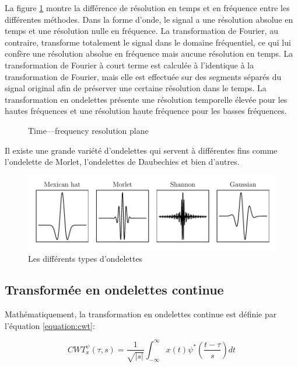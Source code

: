 La figure \ref{fig:time-frequency-plane} montre la différence de résolution en temps et en fréquence entre les différentes méthodes. Dans la forme d'onde, le signal a une résolution absolue en temps et une résolution nulle en fréquence. La transformation de Fourier, au contraire, transforme totalement le signal dans le domaine fréquentiel, ce qui lui confère une résolution absolue en fréquence mais aucune résolution en temps. La transformation de Fourier à court terme est calculée à l'identique à la transformation de Fourier, mais elle est effectuée sur des segments séparés du signal original afin de préserver une certaine résolution dans le temps. La transformation en ondelettes présente une résolution temporelle élevée pour les hautes fréquences et une résolution haute fréquence pour les basses fréquences.

\begin{figure}[H]
    \centering
    
    \caption{Time—frequency resolution plane}
    \label{fig:time-frequency-plane}
\end{figure}

Il existe une grande variété d'ondelettes qui servent à différentes fins comme l'ondelette de Morlet, l'ondelettes de Daubechies et bien d'autres.

\begin{figure}[H]
    \centering
    \includegraphics{figures/wavelets.pdf}
    \caption{Les différents types d'ondelettes}
    \label{fig:wavelets}
\end{figure}

\subsection{Transformée en ondelettes continue}
Mathématiquement, la transformation en ondelettes continue est définie par l'équation \ref{equation:cwt}:

\begin{equation}
    CWT_x^\psi(\tau, s)=\frac{1}{\sqrt{|s|}}\int_{-\infty}^{\infty}x(t)\psi^* \left(\frac{t-\tau}{s}\right)dt
    \label{equation:cwt}
\end{equation}

